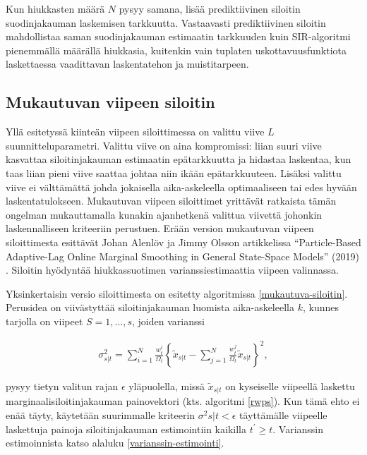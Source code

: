 \documentclass[
  12pt,
  a4paper, twoside]{book}
\begin{document}
Kun hiukkasten määrä \(N\) pysyy samana, lisää prediktiivinen siloitin suodinjakauman laskemisen tarkkuutta. Vastaavasti prediktiivinen siloitin mahdollistaa saman suodinjakauman estimaatin tarkkuuden kuin SIR-algoritmi pienemmällä määrällä hiukkasia, kuitenkin vain tuplaten uskottavuusfunktiota laskettaessa vaadittavan laskentatehon ja muistitarpeen.

\subsection{Mukautuvan viipeen siloitin}

Yllä esitetyssä kiinteän viipeen siloittimessa on valittu viive \(L\) suunnitteluparametri. Valittu viive on aina kompromissi: liian suuri viive kasvattaa siloitinjakauman estimaatin epätarkkuutta ja hidastaa laskentaa, kun taas liian pieni viive saattaa johtaa niin ikään epätarkkuuteen. Lisäksi valittu viive ei välttämättä johda jokaisella aika-askeleella optimaaliseen tai edes hyvään laskentatulokseen. Mukautuvan viipeen siloittimet yrittävät ratkaista tämän ongelman mukauttamalla kunakin ajanhetkenä valittua viivettä johonkin laskennalliseen kriteeriin perustuen. Erään version mukautuvan viipeen siloittimesta esittävät Johan Alenlöv ja Jimmy Olsson artikkelissa ``Particle-Based Adaptive-Lag Online Marginal Smoothing in General State-Space Models'' (2019) \citep{alenlov-2019}. Siloitin hyödyntää hiukkassuotimen varianssiestimaattia viipeen valinnassa.

Yksinkertaisin versio siloittimesta on esitetty algoritmissa \ref{mukautuva-siloitin}. Perusidea on viivästyttää siloitinjakauman luomista aika-askeleella \(k\), kunnes tarjolla on viipeet \(S=1,\ldots,s\), joiden varianssi

\begin{align}\label{siloitin-varianssi}
\sigma^2_{s|t} = \sum_{i=1}^N \frac{w_t^i}{\Omega_t}\left\{\tilde{x}_{s|t} - \sum_{j=1}^N \frac{w_t^j}{\Omega_t}\tilde{x}_{s|t} \right\}^2,
\end{align}

pysyy tietyn valitun rajan \(\epsilon\) yläpuolella, missä \(\tilde{x}_{s|t}\) on kyseiselle viipeellä laskettu marginaalisiloitinjakauman painovektori (kts. algoritmi \ref{rwps}). Kun tämä ehto ei enää täyty, käytetään suurimmalle kriteerin \(\sigma^2{s|t} < \epsilon\) täyttämälle viipeelle laskettuja painoja siloitinjakauman estimointiin kaikilla \(t^\prime \ge t\). Varianssin estimoinnista katso alaluku \ref{varianssin-estimointi}.
\end{document}
